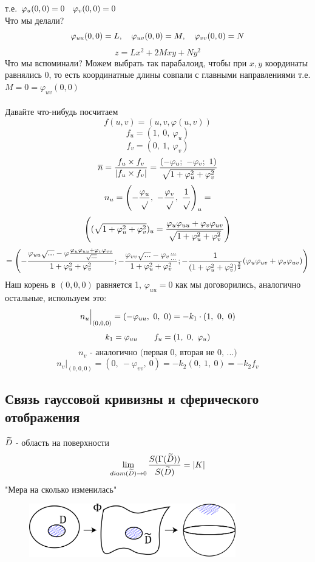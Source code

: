 \documentclass[main]{subfiles}
\begin{document}
    т.е. $\varphi_u(0,0) = 0 \quad \varphi_v(0,0) = 0 $\\
    Что мы делали?
    \[\varphi_{uu}(0,0) = L,\quad \varphi_{uv}(0,0) = M,\quad \varphi_{vv}(0,0) = N\]
    \[z = Lx^2 + 2 Mxy + Ny^2\]
    Что мы вспоминали? Можем выбрать так парабалоид, чтобы при $x,y$ координаты равнялись 0, то есть координатные длины совпали с главными направлениями
    т.е. $M = 0 = \varphi_{uv}(0,0)$\\ \ \\
    Давайте что-нибудь посчитаем
    \[f(u,v) = (u,v, \varphi(u,v))\]
    \[f_u = (1,\ 0,\ \varphi_u)\]
    \[f_v = (0,\ 1,\ \varphi_v)\]
    \[\overline{n} = \frac{f_u \times f_v}{|f_u \times f_v|} = \frac{(-\varphi_u;\ -\varphi_v;\ 1)}{\sqrt{1 + \varphi_u^2 + \varphi_v^2}}\]
    \[n_u = \left(- \frac{\varphi_u}{\sqrt{}},\
    - \frac{\varphi_v}{\sqrt{}},\
    \frac{1}{\sqrt{}}\right)_u = \]
    \[\left((\sqrt{1 + \varphi_u^2 + \varphi_v^2})_u =
    \frac{\varphi_u \varphi_{uu} + \varphi_v \varphi_{uv}}{\sqrt{1 + \varphi_u^2 + \varphi_v^2}}\right)\]
    \[= \left(-\frac{\varphi_{uu}\sqrt{...} - \varphi \frac{\varphi_u \varphi_{uu} + \varphi_v \varphi_{vv}}{\sqrt{...}}}{1+ \varphi_u^2 + \varphi_v^2};
    - \frac{\varphi_{vv} \sqrt{...} - \varphi_v \frac{...}{...}}{1 + \varphi_u^2 + \varphi_v^2};
    -\frac{1}{(1+ \varphi_u^2 + \varphi_v^2)^{\frac{3}{2}}} (\varphi_u \varphi_{uv} + \varphi_v \varphi_{uv})\right)\]
    Наш корень в $(0,0,0)$ равняется 1, $\varphi_{uu}=0$ как мы договорились, аналогично остальные, используем это:
    \[n_u \Big|_{(0,0,0)} = \left(-\varphi_{uu},\ 0,\ 0\right) = -k_1 \cdot (1,\ 0,\ 0)\]
    \[k_1 = \varphi_{uu} \qquad f_u = (1,\ 0,\ \varphi_u)\]
    \[n_v \text{ - аналогично (первая 0, вторая не 0, ...)}\]
    \[n_v \Big|_{(0,0,0)} = (0,\ -\varphi_{vv},\ 0) = -k_2 (0,\ 1,\ 0) = -k_2 f_v\]

    \subsection{Связь гауссовой кривизны и сферического отображения}
    \begin{theorem}
        $\widetilde{D}$ - область на поверхности
        \[\lim_{diam(\widetilde{D}) \rightarrow 0}\frac{S(\Gamma(\widetilde{D}))}{S(\widetilde{D})} = |K|\]
        "Мера на сколько изменилась"{}
        \begin{figure}[H]
            \includegraphics[width=9cm]{pics/10_5.png}
            \centering
        \end{figure}

    \end{theorem}
\end{document}

